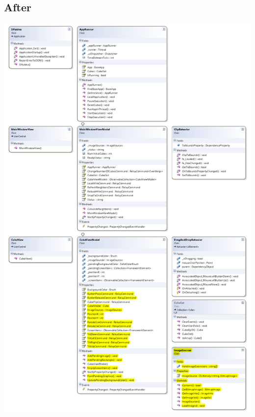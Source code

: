 \documentclass[12pt]{article}
\begin{document}
\subsection*{After}
\includegraphics[scale=.85]{pdfs/SiftablesClassDiagram.png}
\clearpage
\end{document}

